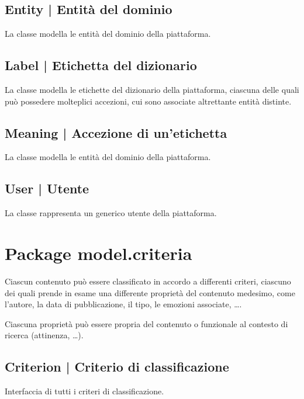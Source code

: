 \documentclass[10pt,a4paper,headinclude,footinclude,hidelinks]{scrreprt} %
\begin{document}
	\subsection[Entity]{Entity | Entità del dominio}
	\label{sec:stage:design:sistema:model:entity}
	La classe modella le entità del dominio della piattaforma.

	\subsection[Label]{Label | Etichetta del dizionario}
	\label{sec:stage:design:sistema:model.search:label}
	La classe modella le etichette del dizionario della piattaforma, ciascuna delle quali può possedere molteplici accezioni, cui sono associate altrettante entità distinte.  

	\subsection[Meaning]{Meaning | Accezione di un'etichetta}
	\label{sec:stage:design:sistema:model:meaning}
	La classe modella le entità del dominio della piattaforma.

	\subsection[User]{User | Utente}
	\label{sec:stage:design:sistema:model:user}
	La classe rappresenta un generico utente della piattaforma.

	\section{Package model.criteria}
	\label{sec:stage:design:sistema:model.criteria}
	Ciascun contenuto può essere classificato in accordo a differenti criteri, ciascuno dei quali prende in esame una differente proprietà del contenuto medesimo, come l'autore, la data di pubblicazione, il tipo, le emozioni associate, \ldots .

	Ciascuna proprietà può essere propria del contenuto o funzionale al contesto di ricerca (attinenza, \ldots).

	\subsection[Criterion]{Criterion | Criterio di classificazione}
	\label{sec:stage:design:sistema:model.criteria:criteria}
	Interfaccia di tutti i criteri di classificazione.
\end{document}
